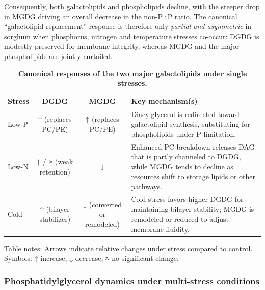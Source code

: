\documentclass[10pt,letterpaper]{article}
\begin{document}
Consequently, both galactolipids and phospholipids decline, with the steeper
drop in MGDG driving an overall decrease in the non-P : P ratio.
The canonical “galactolipid replacement” response is therefore only
\emph{partial and asymmetric} in sorghum when phosphorus, nitrogen and
temperature stresses co-occur: DGDG is modestly preserved for membrane
integrity, whereas MGDG and the major phospholipids are jointly curtailed.

\begin{table}[!ht]
  \begin{adjustwidth}{-2.25in}{0in} %
    \centering
    \caption{{\bf Canonical responses of the two major galactolipids under single stresses.}}
    \begin{tabular}{|l|c|c|p{3.8in}|}
      \hline
      \textbf{Stress} & \textbf{DGDG} & \textbf{MGDG} & \textbf{Key mechanism(s)} \\ \hline
      Low-P  & ↑ (replaces PC/PE) & ↑ (replaces PC/PE) & Diacylglycerol is redirected toward galactolipid synthesis, substituting for phospholipids under P limitation. \\ \hline
      Low-N  & ↑ / ≈ (weak retention) & ↓ & Enhanced PC breakdown releases DAG that is partly channeled to DGDG, while MGDG tends to decline as resources shift to storage lipids or other pathways. \\ \hline
      Cold   & ↑ (bilayer stabilizer) & ↓ (converted or remodeled) & Cold stress favors higher DGDG for maintaining bilayer stability; MGDG is remodeled or reduced to adjust membrane fluidity. \\ \hline
    \end{tabular}
    \begin{flushleft}
      Table notes: Arrows indicate relative changes under stress compared to control. Symbols: ↑ increase, ↓ decrease, ≈ no significant change.
    \end{flushleft}
    \label{table:galactolipid_responses}
  \end{adjustwidth}
\end{table}

\subsubsection*{Phosphatidylglycerol dynamics under multi-stress conditions}
\end{document}
